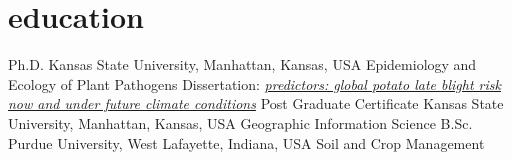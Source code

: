 \section*{education}

\begin{entrylist}
    {Ph.D. {}}
    {Kansas State University, Manhattan, Kansas, USA}
    {Epidemiology and Ecology of Plant Pathogens}
  \entry{}
    {Dissertation: }
    {}
      {\emph{\href{https://krex.k-state.edu/dspace/handle/2097/2341?show=full}{predictors: global potato late blight risk now and under future climate conditions}}}
    {Post Graduate Certificate {}}
    {Kansas State University, Manhattan, Kansas, USA}
    {Geographic Information Science}
    {B.Sc. {}}
    {Purdue University, West Lafayette, Indiana, USA}
    {Soil and Crop Management}
\end{entrylist}
